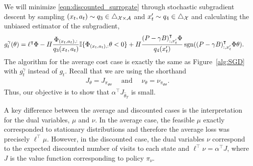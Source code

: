 \documentclass[11pt]{article}
\begin{document}
We will minimize \eqref{eqn:discounted_surrogate} through stochastic subgradient descent by sampling 
$(x_t,a_t)\sim q_3\in\triangle_{{\cal X} \times {\cal A}}$ and $x_t' \sim q_4\in\triangle_{{\cal X}}$ and calculating the unbiased estimator of the subgradient, 
\begin{align}
\label{eq:grad_discounted}
g^\gamma_t(\theta) &= \ell^\intercal \Phi - H \frac{\Phi_{(x_t,a_t),:}}{q_3(x_t,a_t)} {\mathbb I}{\{\Phi_{(x_t,a_t),:} \theta < 0\}} + H  \frac{(P-\gamma B)_{:,x_t'}^\intercal \Phi}{q_4(x_t')} \operatorname*{sgn}((P-\gamma B)_{:,x_t'}^\intercal \Phi \theta).
\end{align}
The algorithm for the average cost case is exactly the same as Figure~\ref{alg:SGD} with $g_t^\gamma$ instead of $g_t$.
Recall that we are using the shorthand
\begin{align*}
J_\theta  = J_{\pi_{\Phi\theta}} \quad \text{ and }\quad
\nu_\theta = \nu_{\pi_{\Phi\theta}}.
\end{align*}
Thus, our objective is to show that $\alpha^\top J_{\widehat \theta_T}$ is small.

A key difference between the average and discounted cases is the interpretation for the dual variables, $\mu$ and $\nu$. In the average case, the feasible $\mu$ exactly corresponded to stationary distributions and therefore the average loss was precisely $\ell^\top\mu$. However, in the discounted case, the dual variables $\nu$ correspond to the expected discounted number of visits to each state and $\ell^\top\nu = \alpha^\top J$, where $J$ is the value function corresponding to policy $\pi_\nu$.
\end{document}
